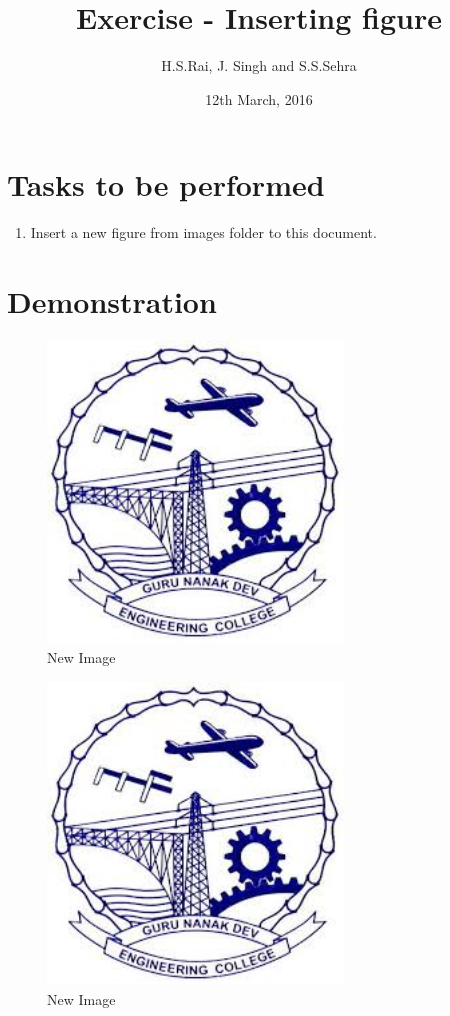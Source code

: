 \documentclass{report}
\title{Exercise - Inserting figure}
\author{H.S.Rai, J. Singh and S.S.Sehra}
\date{12th March, 2016}
\begin{document}
\maketitle	
\listoffigures
\section*{Tasks to be performed}
\begin{enumerate}	
\item Insert a new figure from images folder to this document.
\end{enumerate}
\section*{Demonstration}
\begin{figure}
\centering
\includegraphics[width=0.7\textwidth]{../../images/gnelogo}
\caption{New Image}
\label{fig:gnelogo}
\end{figure}
\begin{figure}
\centering
\includegraphics[width=0.7\textwidth]{../../images/gnelogo}
\caption{New Image}
\label{fig:gnelogo1}
\end{figure}
\end{document}
